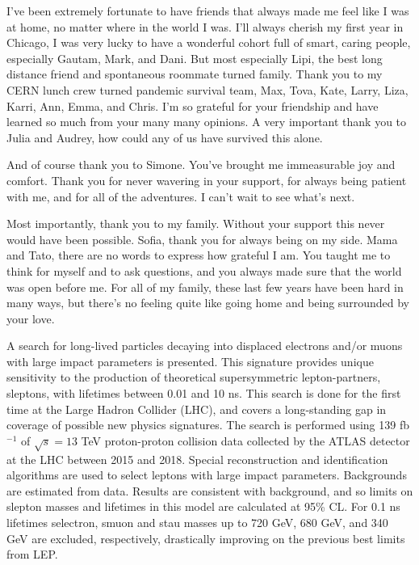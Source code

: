 \documentclass{ucetd}
\begin{document}
I've been extremely fortunate to have friends that always made me feel like I was at home, no matter where in the world I was. I'll always cherish my first year in Chicago, I was very lucky to have a wonderful cohort full of smart, caring people, especially Gautam, Mark, and Dani. But most especially Lipi, the best long distance friend and spontaneous roommate turned family. 
Thank you to my CERN lunch crew turned pandemic survival team, Max, Tova, Kate, Larry, Liza, Karri, Ann, Emma, and Chris. I'm so grateful for your friendship and have learned so much from your many many opinions.
A very important thank you to Julia and Audrey, how could any of us have survived this alone. 

And of course thank you to Simone. You've brought me immeasurable joy and comfort. Thank you for never wavering in your support, for always being patient with me, and for all of the adventures. I can't wait to see what's next.

Most importantly, thank you to my family. Without your support this never would have been possible. Sofia, thank you for always being on my side. Mama and Tato, there are no words to express how grateful I am. You taught me to think for myself and to ask questions, and you always made sure that the world was open before me.  For all of my family, these last few years have been hard in many ways, but there's no feeling quite like going home and being surrounded by your love.
 




\abstract
A search for long-lived particles decaying into displaced electrons and/or muons with large impact parameters is presented. This signature provides unique sensitivity to the production of theoretical supersymmetric lepton-partners, sleptons, with lifetimes between 0.01 and 10 ns. This search is done for the first time at the Large Hadron Collider (LHC), and covers a long-standing gap in coverage of possible new physics signatures. The search is performed using 139 fb$^{-1}$ of $\sqrt{s} = 13$ TeV proton-proton collision data collected by the ATLAS detector at the LHC between 2015 and 2018. Special reconstruction and identification algorithms are used to select leptons with large impact parameters. Backgrounds are estimated from data. Results are consistent with background, and so limits on slepton masses and lifetimes in this model are calculated at 95\% CL. For 0.1 ns lifetimes selectron, smuon and stau masses up to 720 GeV, 680 GeV, and 340 GeV are excluded, respectively, drastically improving on the previous best limits from LEP. 
\end{document}
